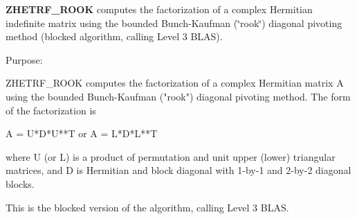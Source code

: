 {\bfseries Z\+H\+E\+T\+R\+F\+\_\+\+R\+O\+O\+K} computes the factorization of a complex Hermitian indefinite matrix using the bounded Bunch-\/\+Kaufman (\char`\"{}rook\char`\"{}) diagonal pivoting method (blocked algorithm, calling Level 3 B\+L\+A\+S). 

 \begin{DoxyParagraph}{Purpose\+: }
\begin{DoxyVerb} ZHETRF_ROOK computes the factorization of a complex Hermitian matrix A
 using the bounded Bunch-Kaufman ("rook") diagonal pivoting method.
 The form of the factorization is

    A = U*D*U**T  or  A = L*D*L**T

 where U (or L) is a product of permutation and unit upper (lower)
 triangular matrices, and D is Hermitian and block diagonal with
 1-by-1 and 2-by-2 diagonal blocks.

 This is the blocked version of the algorithm, calling Level 3 BLAS.\end{DoxyVerb}
 
\end{DoxyParagraph}

